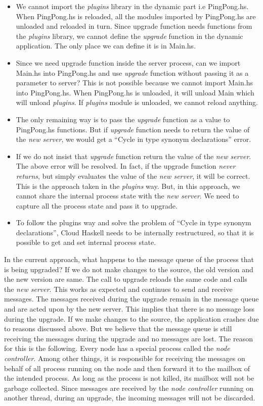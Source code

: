 \begin{itemize}
\item We cannot import the \emph{plugins} library in the dynamic part
  i.e PingPong.hs. When PingPong.hs is reloaded, all the modules
  imported by PingPong.hs are unloaded and reloaded in turn. Since
  upgrade function needs functions from the \emph{plugins} library, we
  cannot define the \emph{upgrade} function in the dynamic
  application. The only place we can define it is in Main.hs.
\item Since we need upgrade function inside the server process, can we
  import Main.hs into PingPong.hs and use \emph{upgrade} function
  without passing it as a parameter to server? This is not possible
  because we cannot import Main.hs into PingPong.hs. When PingPong.hs
  is unloaded, it will unload Main which will unload
  \emph{plugins}. If \emph{plugins} module is unloaded, we cannot
  reload anything.
\item The only remaining way is to pass the \emph{upgrade} function as
  a value to PingPong.hs functions. But if \emph{upgrade} function
  needs to return the value of the \emph{new server}, we would get a
  ``Cycle in type synonym declarations'' error.
\item If we do not insist that \emph{upgrade} function return the
  value of the \emph{new server}. The above error will be resolved. In
  fact, if the upgrade function \emph{never returns}, but simply
  evaluates the value of the \emph{new server}, it will be
  correct. This is the approach taken in the \emph{plugins} way. But,
  in this approach, we cannot share the internal process state with
  the \emph{new server}. We need to capture all the process state and
  pass it to upgrade.
\item To follow the plugins way and solve the problem of ``Cycle in
  type synonym declarations'', Cloud Haskell needs to be internally
  restructured, so that it is possible to get and set internal
  process state.
\end{itemize}

In the current approach, what happens to the message queue of the
process that is being upgraded? If we do not make changes to the
source, the old version and the new version are same. The call to
upgrade reloads the same code and calls the \emph{new server}. This
works as expected and continues to send and receive messages.  The
messages received during the upgrade remain in the message queue and
are acted upon by the new server. This implies that there is no
message loss during the upgrade. If we make changes to the source, the
application crashes due to reasons discussed above. But we believe
that the message queue is still receiving the messages during the
upgrade and no messages are lost. The reason for this is the
following. Every node has a special process called the \emph{node controller}.
Among other things, it is responsible for receiving the messages on
behalf of all process running on the node and then forward it to the
mailbox of the intended process. As long as the process is not killed,
its mailbox will not be garbage collected. Since messages are received
by the \emph{node controller} running on another thread, during
an upgrade, the incoming messages will not be discarded.

